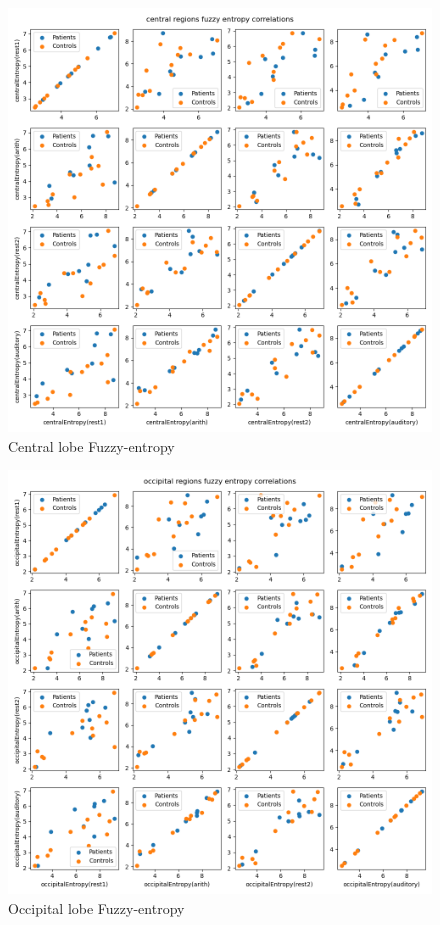 \documentclass[10pt]{article}
\begin{document}
\begin{figure}[H]
  \includegraphics[width=16cm]{../../../data_analysis_results/FuzzEnt/central_region_corr.png}
  \caption{Central lobe Fuzzy-entropy}\label{central_fuzz}
\end{figure}
\begin{figure}[H]
  \includegraphics[width=16cm]{../../../data_analysis_results/FuzzEnt/occipital_region_corr.png}
  \caption{Occipital lobe Fuzzy-entropy}\label{occipital_fuzz}
\end{figure}
\end{document}
